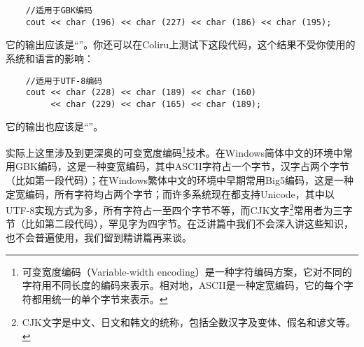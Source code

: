\begin{lstlisting}
    //适用于GBK编码
    cout << char (196) << char (227) << char (186) << char (195);
\end{lstlisting}
它的输出应该是``''。你还可以在Coliru上测试下这段代码，这个结果不受你使用的系统和语言的影响：
\begin{lstlisting}
    //适用于UTF-8编码
    cout << char (228) << char (189) << char (160)
         << char (229) << char (165) << char (189);
\end{lstlisting}
它的输出也应该是``''。\par
实际上这里涉及到更深奥的可变宽度编码\footnote{可变宽度编码（Variable-width encoding）是一种字符编码方案，它对不同的字符用不同长度的编码来表示。相对地，ASCII是一种定宽编码，它的每个字符都用统一的单个字节来表示。}技术。在Windows简体中文的环境中常用GBK编码，这是一种变宽编码，其中ASCII字符占一个字节，汉字占两个字节（比如第一段代码）；在Windows繁体中文的环境中早期常用Big5编码，这是一种定宽编码，所有字符均占两个字节；而许多系统现在都支持Unicode，其中以UTF-8实现方式为多，所有字符占一至四个字节不等，而CJK文字\footnote{CJK文字是中文、日文和韩文的统称，包括全数汉字及变体、假名和谚文等。}常用者为三字节（比如第二段代码），罕见字为四字节。在泛讲篇中我们不会深入讲这些知识，也不会普遍使用，我们留到精讲篇再来谈。\par
